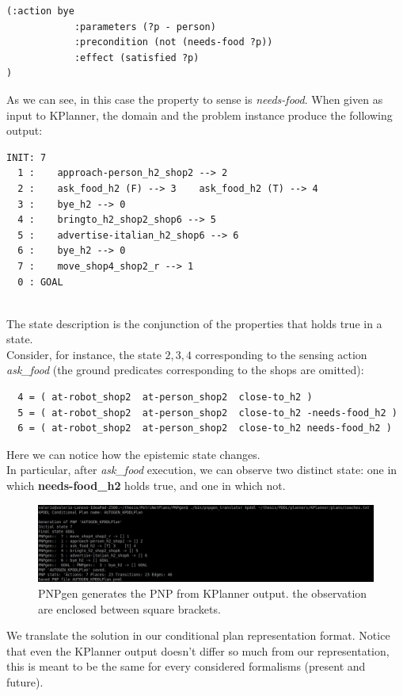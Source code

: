 \documentclass[pdftex,12pt,a4paper]{report}
\begin{document}
\begin{verbatim}
(:action bye
            :parameters (?p - person)
            :precondition (not (needs-food ?p))
            :effect (satisfied ?p)
)
\end{verbatim}
\noindent As we can see, in this case the property to sense is \textit{needs-food}.
\noindent When given as input to KPlanner, the domain and the problem instance produce the following output:
\begin{verbatim}
INIT: 7
  1 :    approach-person_h2_shop2 --> 2 
  2 :    ask_food_h2 (F) --> 3    ask_food_h2 (T) --> 4 
  3 :    bye_h2 --> 0 
  4 :    bringto_h2_shop2_shop6 --> 5 
  5 :    advertise-italian_h2_shop6 --> 6 
  6 :    bye_h2 --> 0 
  7 :    move_shop4_shop2_r --> 1 
  0 : GOAL
\end{verbatim}\\
\noindent The state description is the conjunction of the properties that holds true in a state.\\ 
Consider, for instance, the state $2, 3, 4$ corresponding to the sensing action \textit{ask\_food} (the ground predicates corresponding to the shops are omitted): 
\begin{verbatim}
  4 = ( at-robot_shop2  at-person_shop2  close-to_h2 )
  5 = ( at-robot_shop2  at-person_shop2  close-to_h2 -needs-food_h2 )
  6 = ( at-robot_shop2  at-person_shop2  close-to_h2 needs-food_h2 )
\end{verbatim}
Here we can notice how the epistemic state changes.\\ 
In particular, after \textit{ask\_food} execution, we can observe two distinct state: one in which \textbf{needs-food\_h2} holds true, and one in which not.

\begin{figure}[H]
	\centering
	\includegraphics[scale=0.4, trim = 20mm 0mm 0mm 0mm]{images/kpddl_coaches.png}
	\caption{PNPgen generates the PNP from KPlanner output. the observation are enclosed between square brackets.}
\end{figure}

\noindent We translate the solution in our conditional plan representation format. Notice that even the KPlanner output doesn't differ so much from our representation, this is meant to be the same for every considered formalisms (present and future).
\end{document}

